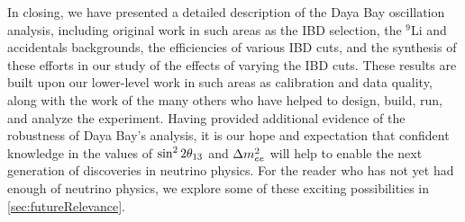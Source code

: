 \documentclass[../thesis.tex]{subfiles}
\begin{document}
In closing, we have presented a detailed description of the Daya Bay oscillation analysis, including original work in such areas as the IBD selection, the $^9$Li and accidentals backgrounds, the efficiencies of various IBD cuts, and the synthesis of these efforts in our study of the effects of varying the IBD cuts. These results are built upon our lower-level work in such areas as calibration and data quality, along with the work of the many others who have helped to design, build, run, and analyze the experiment. Having provided additional evidence of the robustness of Daya Bay's analysis, it is our hope and expectation that confident knowledge in the values of $\sin^2 2\theta_{13}$ and $\Delta m^2_{ee}$ will help to enable the next generation of discoveries in neutrino physics. For the reader who has not yet had enough of neutrino physics, we explore some of these exciting possibilities in \autoref{sec:futureRelevance}.


\end{document}
